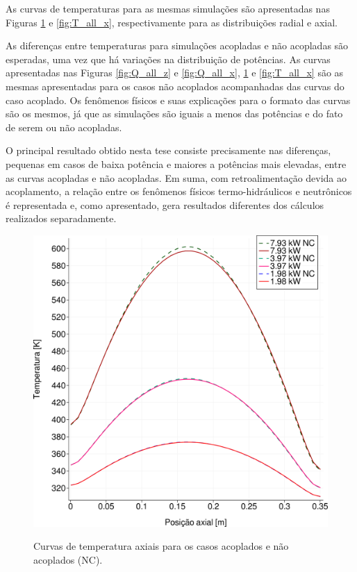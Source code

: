 As curvas de temperaturas para as mesmas simulações são apresentadas nas
Figuras \ref{fig:T_all_z} e \ref{fig:T_all_x}, respectivamente para as
distribuições radial e axial.

As diferenças entre temperaturas para simulações acopladas e não acopladas são
esperadas, uma vez que há variações na distribuição  de potências. As curvas apresentadas nas Figuras
\ref{fig:Q_all_z} e \ref{fig:Q_all_x}, \ref{fig:T_all_z} e \ref{fig:T_all_x} são
as mesmas apresentadas para os casos não acoplados acompanhadas das curvas do
caso acoplado. Os fenômenos físicos e suas explicações para o formato das curvas
são os mesmos, já que as simulações são iguais a menos das potências e do fato
de serem ou não acopladas.

O principal resultado obtido nesta tese consiste precisamente nas diferenças,
pequenas em casos de baixa potência e maiores a potências mais elevadas, entre as curvas acopladas e não acopladas.
Em suma, com retroalimentação devida ao acoplamento, a relação entre os fenômenos
físicos termo-hidráulicos e neutrônicos é representada e, como apresentado,
gera resultados diferentes dos cálculos realizados separadamente.


\begin{figure}[htb]
  \caption{Curvas de temperatura axiais para os casos acoplados e não acoplados (NC).}
  \centering\includegraphics[scale=0.5]{figuras/T_z_all_square_port.png}
  \label{fig:T_all_z}
\end{figure}


